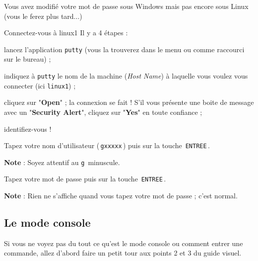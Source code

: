 \documentclass[a4paper,11pt]{article}
\begin{document}
\par
        
Vous avez modifi\'e votre mot de passe sous Windows mais pas encore sous Linux (vous le ferez plus tard...)
				
\begin{Tutoriel}{Connectez-vous \`a linux1} 
Il y a 4 \'etapes :
\par
        
\begin{steps}
				
\item lancez l'application \verb_putty_ (vous la trouverez dans le menu ou comme raccourci sur le bureau) ;
					
\item indiquez \`a \verb_putty_ le nom de la machine (\textit{Host Name}) \`a laquelle vous voulez vous connecter (ici \verb_linux1_) ;

\item cliquez sur "\textbf{Open}" ; la connexion se fait ! S'il vous pr\'esente une boite de message avec un "\textbf{Security Alert}", cliquez sur "\textbf{Yes}" en toute confiance ;
					
\item identifiez-vous !
						
\begin{steps}
\item Tapez votre nom d'utilisateur (\,\verb|gxxxxx|\,) puis sur la touche \,\verb|ENTREE|\,.\par 
\textbf{Note} : Soyez attentif au \verb|g|\, minuscule.

\item Tapez votre mot de passe puis sur la touche \,\verb|ENTREE|\,.\par
\textbf{Note} : Rien ne s'affiche quand vous tapez votre mot de passe ; c'est normal.
\end{steps}
\end{steps}
\end{Tutoriel}		       

\subsection{Le mode console}
Si vous ne voyez pas du tout ce qu'est le mode console ou comment entrer une commande, allez d'abord faire un petit tour aux points 2 et 3 du guide visuel.
				
\end{document}
